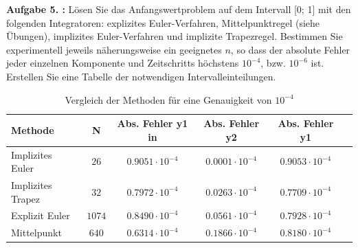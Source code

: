 \begin{mybox}
	\textbf{Aufgabe 5. :}	Lösen Sie das Anfangswertproblem auf dem Intervall [0; 1] mit den folgenden Integratoren: explizites
	Euler-Verfahren, Mittelpunktregel (siehe Übungen), implizites Euler-Verfahren und implizite
	Trapezregel. Bestimmen Sie experimentell jeweils näherungsweise ein geeignetes $n$, so dass der absolute Fehler jeder einzelnen Komponente und Zeitschritts höchstens $10^{-4}$, bzw. $10^{-6}$ ist.
	Erstellen Sie eine Tabelle der notwendigen Intervalleinteilungen.
\end{mybox}
\begin{table}
	\centering
	\caption{Vergleich der Methoden für eine Genauigkeit von $10^{-4}$}
	\label{t:fehler}
	\begin{tabular}{lccccc}
		\toprule
		
		Methode      & N  & Abs. Fehler y1 in  &     Abs. Fehler y2 & Abs. Fehler y1                   \\
		\midrule
		Implizites Euler  & $26$ & $0.9051\cdot10^{-4}$  & $0.0001\cdot10^{-4} $ &      $0.9053\cdot10^{-4}$        \\
		Implizites Trapez  & $32$ & $0.7972 \cdot10^{-4} $  & $0.0263\cdot10^{-4} $ &      $0.7709\cdot10^{-4}$        \\
		Explizit Euler  & $1074$ & $	0.8490\cdot10^{-4}  $  & $0.0561 \cdot10^{-4} $ &      $0.7928\cdot10^{-4}$        \\
      	Mittelpunkt  & $ 640 $ & $	0.6314\cdot10^{-4}  $  & $0.1866  \cdot10^{-4} $ &      $0.8180\cdot10^{-4}$        \\
	              
		\bottomrule
		
	\end{tabular}
\end{table}



